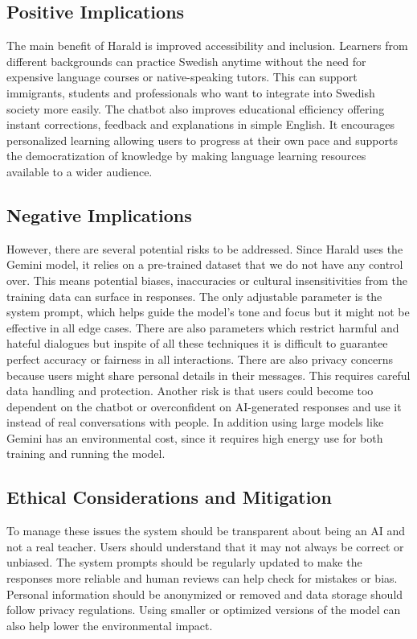 \documentclass[a4paper,10pt]{article}
\begin{document}
\subsection{Positive Implications}
The main benefit of Harald is improved accessibility and inclusion. Learners from different backgrounds can practice Swedish anytime without the need for expensive language courses or native-speaking tutors. This can support immigrants, students and professionals who want to integrate into Swedish society more easily. The chatbot also improves educational efficiency offering instant corrections, feedback and explanations in simple English. It encourages personalized learning allowing users to progress at their own pace and supports the democratization of knowledge by making language learning resources available to a wider audience.

\subsection{Negative Implications}
However, there are several potential risks to be addressed. Since Harald uses the Gemini model, it relies on a pre-trained dataset that we do not have any control over. This means potential biases, inaccuracies or cultural insensitivities from the training data can surface in responses. The only adjustable parameter is the system prompt, which helps guide the model’s tone and focus but it might not be effective in all edge cases. There are also parameters which restrict harmful and hateful dialogues but inspite of all these techniques it is difficult to guarantee perfect accuracy or fairness in all interactions. There are also privacy concerns because users might share personal details in their messages. This requires careful data handling and protection. Another risk is that users could become too dependent on the chatbot or overconfident on AI-generated responses and use it instead of real conversations with people. In addition using large models like Gemini has an environmental cost, since it requires high energy use for both training and running the model.

\subsection{Ethical Considerations and Mitigation}
To manage these issues the system should be transparent about being an AI and not a real teacher. Users should understand that it may not always be correct or unbiased. The system prompts should be regularly updated to make the responses more reliable and human reviews can help check for mistakes or bias. Personal information should be anonymized or removed and data storage should follow privacy regulations. Using smaller or optimized versions of the model can also help lower the environmental impact.
\end{document}
